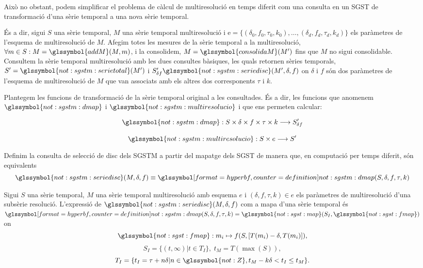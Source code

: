 Això no obstant, podem simplificar el problema de càlcul de
multiresolució en temps diferit com una consulta en un \gls{SGST} de
transformació d'una sèrie temporal a una nova sèrie temporal.

És a dir, sigui $S$ una sèrie temporal, $M$ una sèrie temporal
multiresolució i $\text{e} = \{ (\delta_0,f_0,\tau_0,k_0), \ldots,
(\delta_d,f_d,\tau_d,k_d)\}$ els paràmetres de l'esquema de
multiresolució de $M$. Afegim totes les mesures de la sèrie temporal a
la multiresolució, $\forall m \in S:
M=\glssymbol{addM}(M,m)$, i la consolidem, $M=\glssymbol{consolidaM}(M')$ fins que
$M$ no sigui consolidable. Consultem la sèrie temporal multiresolució
amb les dues consultes bàsiques, les quals retornen sèries temporals,
$S'=\glssymbol{not:sgstm:serietotal}(M')$ i $S_{\delta
  f}'\glssymbol{not:sgstm:seriedisc}(M',\delta,f)$ on $\delta$ i $f$
són dos paràmetres de l'esquema de multiresolució de $M$ que van
associats amb els altres dos corresponents $\tau$ i $k$.



Plantegem les funcions de transformació de la sèrie temporal original
a les consultades. És a dir, les funcions que anomenem
$\glssymbol{not:sgstm:dmap}$ i $\glssymbol{not:sgstm:multiresolucio}$
i que ens permeten calcular:

\[
\glssymbol{not:sgstm:dmap}: S \times \delta \times f \times \tau \times k \longrightarrow
S'_{\delta f}
\]


\[
 \glssymbol{not:sgstm:multiresolucio}: S \times e  \longrightarrow S'
\]



Definim la consulta de selecció de disc dels \gls{SGSTM} a partir del
mapatge dels \gls{SGST} de manera que, en computació per temps
diferit, són equivalents
\[
\glssymbol{not:sgstm:seriedisc}(M,\delta,f) \equiv
\glssymboldef{not:sgstm:dmap}(S,\delta,f,\tau,k)
\]


\begin{definition}
  Sigui $S$ una sèrie temporal, $M$ una sèrie temporal multiresolució
  amb esquema $e$ i $(\delta,f,\tau,k)\in e$ els paràmetres de
  multiresolució d'una subsèrie resolució. L'expressió de
  $\glssymbol{not:sgstm:seriedisc}(M,\delta,f)$ com a mapa d'una sèrie
  temporal és
  $\glssymboldef{not:sgstm:dmap}(S,\delta,f,\tau,k)=\glssymbol{not:sgst:map}(S_I,\glssymbol{not:sgst:fmap})$
  on
  \[
  \glssymbol{not:sgst:fmap}: m_i\mapsto f(S, [T(m_i)-\delta,T(m_i)]),
  \]
  \[
  S_I = \{ (t,\infty) | t\in T_I  \},\;  t_M = T(\max(S)),
  \]
  \[
  T_I = \{ t_I = \tau+n\delta | n\in\glssymbol{not:Z}, t_M - k\delta <
  t_I \leq t_M \}.
  \]
\end{definition}



